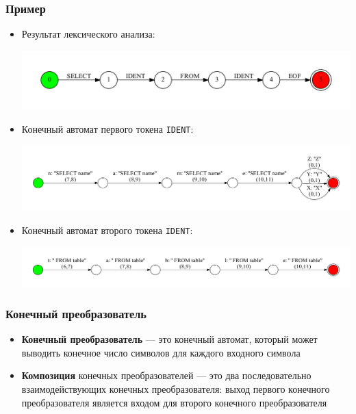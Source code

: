 \documentclass{beamer}
\begin{document}
\begin{frame}[fragile]
\transwipe[direction=90]
\frametitle{Пример}
\begin{itemize}
\item Результат лексического анализа:
    \begin{center}
        {\includegraphics[width=1.0\linewidth]{tsql_test_appr}}
    \end{center}
        
\item Конечный автомат первого токена \verb|IDENT|:
    \begin{center}
        {\includegraphics[width=1.0\linewidth]{tsql_ident_1}}
    \end{center}

\item Конечный автомат второго токена \verb|IDENT|:
    \begin{center}
        {\includegraphics[width=1.0\linewidth]{tsql_ident_2}}
    \end{center}
\end{itemize}
\end{frame}


\begin{frame}[fragile]
\transwipe[direction=90]
\frametitle{Конечный преобразователь}
\begin{itemize}
\item \textbf{Конечный преобразователь} --- это конечный автомат, который может выводить конечное число символов для каждого входного символа

\item \textbf{Композиция} конечных преобразователей --- это два последовательно взаимодействующих конечных преобразователя: выход первого конечного преобразователя является входом для второго конечного преобразователя
\end{itemize}
\end{frame}
\end{document}
